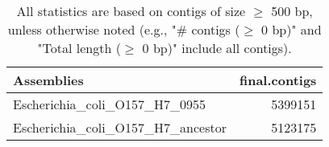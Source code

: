 \documentclass[12pt,a4paper]{article}
\begin{document}
\begin{table}[ht]
\begin{center}
\caption{All statistics are based on contigs of size $\geq$ 500 bp, unless otherwise noted (e.g., "\# contigs ($\geq$ 0 bp)" and "Total length ($\geq$ 0 bp)" include all contigs).}
\begin{tabular}{|l*{1}{|r}|}
\hline
Assemblies & final.contigs \\ \hline
Escherichia\_coli\_O157\_H7\_0955 & 5399151 \\ \hline
Escherichia\_coli\_O157\_H7\_ancestor & 5123175 \\ \hline
\end{tabular}
\end{center}
\end{table}
\end{document}

